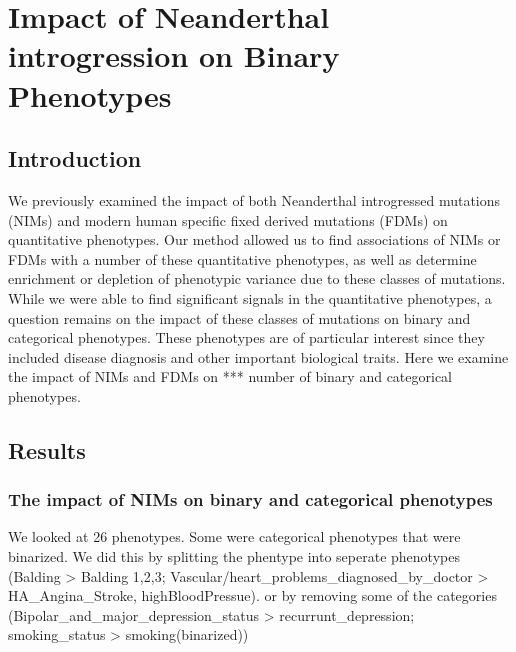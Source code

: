 \chapter{Impact of Neanderthal introgression on Binary Phenotypes}
\section{Introduction}
We previously examined the impact of both Neanderthal introgressed mutations (NIMs) and modern human specific fixed derived mutations (FDMs) on quantitative phenotypes. Our method allowed us to find associations of NIMs or FDMs with a number of these quantitative phenotypes, as well as determine enrichment or depletion of phenotypic variance due to these classes of mutations. While we were able to find significant signals in the quantitative phenotypes, a question remains on the impact of these classes of mutations on binary and categorical phenotypes. These phenotypes are of particular interest since they included disease diagnosis and other important biological traits. Here we examine the impact of NIMs and FDMs on *** number of binary and categorical phenotypes.

\section{Results}
\subsection{The impact of NIMs on binary and categorical phenotypes}

We looked at 26 phenotypes. Some were categorical phenotypes that were binarized. We did this by splitting the phentype into seperate phenotypes (Balding > Balding 1,2,3; Vascular/heart_problems_diagnosed_by_doctor > HA_Angina_Stroke, highBloodPressue). or by removing some of the categories (Bipolar_and_major_depression_status > recurrunt_depression; smoking_status > smoking(binarized))


